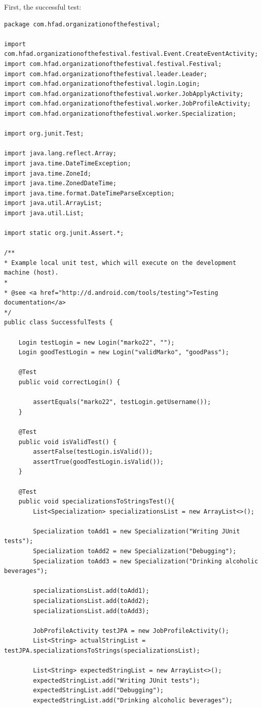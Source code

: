			First, the successful test:
			\begin{lstlisting}
package com.hfad.organizationofthefestival;

import com.hfad.organizationofthefestival.festival.Event.CreateEventActivity;
import com.hfad.organizationofthefestival.festival.Festival;
import com.hfad.organizationofthefestival.leader.Leader;
import com.hfad.organizationofthefestival.login.Login;
import com.hfad.organizationofthefestival.worker.JobApplyActivity;
import com.hfad.organizationofthefestival.worker.JobProfileActivity;
import com.hfad.organizationofthefestival.worker.Specialization;

import org.junit.Test;

import java.lang.reflect.Array;
import java.time.DateTimeException;
import java.time.ZoneId;
import java.time.ZonedDateTime;
import java.time.format.DateTimeParseException;
import java.util.ArrayList;
import java.util.List;

import static org.junit.Assert.*;

/**
* Example local unit test, which will execute on the development machine (host).
*
* @see <a href="http://d.android.com/tools/testing">Testing documentation</a>
*/
public class SuccessfulTests {
	
	Login testLogin = new Login("marko22", "");
	Login goodTestLogin = new Login("validMarko", "goodPass");
	
	@Test
	public void correctLogin() {
		
		assertEquals("marko22", testLogin.getUsername());
	}
	
	@Test
	public void isValidTest() {
		assertFalse(testLogin.isValid());
		assertTrue(goodTestLogin.isValid());
	}
	
	@Test
	public void specializationsToStringsTest(){
		List<Specialization> specializationsList = new ArrayList<>();
		
		Specialization toAdd1 = new Specialization("Writing JUnit tests");
		Specialization toAdd2 = new Specialization("Debugging");
		Specialization toAdd3 = new Specialization("Drinking alcoholic beverages");
		
		specializationsList.add(toAdd1);
		specializationsList.add(toAdd2);
		specializationsList.add(toAdd3);
		
		JobProfileActivity testJPA = new JobProfileActivity();
		List<String> actualStringList = testJPA.specializationsToStrings(specializationsList);
		
		List<String> expectedStringList = new ArrayList<>();
		expectedStringList.add("Writing JUnit tests");
		expectedStringList.add("Debugging");
		expectedStringList.add("Drinking alcoholic beverages");
		

\end{lstlisting}
